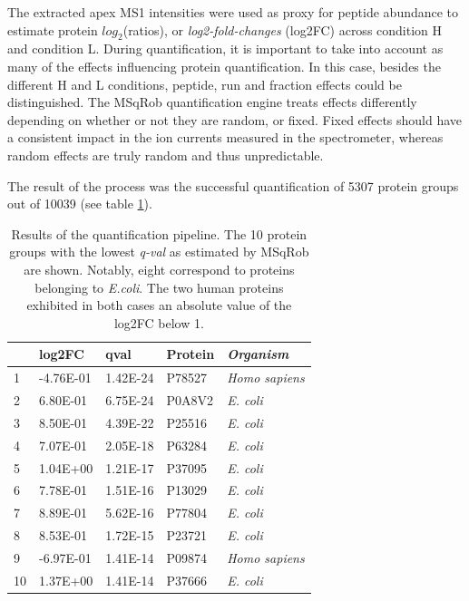 \documentclass[11pt, a4paper]{report}
\begin{document}
The extracted apex MS1 intensities were used as proxy for peptide abundance to estimate protein $log_2$(ratios), or \textit{log2-fold-changes} (\ac{log2FC}) across condition H and condition L. During quantification, it is important to take into account as many of the effects influencing protein quantification. In this case, besides the different H and L conditions, peptide, run and fraction effects could be distinguished. The MSqRob quantification engine treats effects differently depending on whether or not they are random, or fixed. Fixed effects should have a consistent impact in the ion currents measured in the spectrometer, whereas random effects are truly random and thus unpredictable.

The result of the process was the successful quantification of 5307 protein groups out of 10039 (see table \ref{tab:quantification_table}).

\begin{table}[ht]
\centering
\begin{tabular}{llll>{\itshape}l}
  \toprule
 & \ac{log2FC} & qval & Protein & Organism \\ 
  \midrule
1 & -4.76E-01 & 1.42E-24 & P78527 & Homo sapiens \\ 
   \rowcolor[gray]{0.95}2 & 6.80E-01 & 6.75E-24 & P0A8V2 & E. coli \\ 
  3 & 8.50E-01 & 4.39E-22 & P25516 & E. coli \\ 
   \rowcolor[gray]{0.95}4 & 7.07E-01 & 2.05E-18 & P63284 & E. coli \\ 
  5 & 1.04E+00 & 1.21E-17 & P37095 & E. coli \\ 
   \rowcolor[gray]{0.95}6 & 7.78E-01 & 1.51E-16 & P13029 & E. coli \\ 
  7 & 8.89E-01 & 5.62E-16 & P77804 & E. coli \\ 
   \rowcolor[gray]{0.95}8 & 8.53E-01 & 1.72E-15 & P23721 & E. coli \\ 
  9 & -6.97E-01 & 1.41E-14 & P09874 & Homo sapiens \\ 
   \rowcolor[gray]{0.95}10 & 1.37E+00 & 1.41E-14 & P37666 & E. coli \\ 
   \bottomrule
\end{tabular}
\caption{Results of the quantification pipeline. The 10 protein groups with the lowest \textit{q-val}  as estimated by MSqRob are shown. Notably, eight correspond to proteins belonging to \textit{E.coli}. The two human proteins exhibited in both cases an absolute value of the \ac{log2FC} below 1.}
\label{tab:quantification_table}
\end{table}
\end{document}
